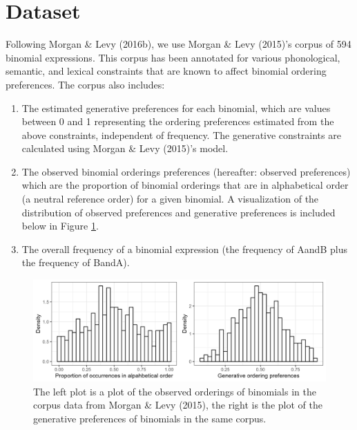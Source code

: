 \documentclass[10pt, letterpaper]{article}
\newenvironment{CodeChunk}{}{}
\begin{document}
\hypertarget{dataset}{%
\section{Dataset}\label{dataset}}

Following Morgan \& Levy (2016b), we use Morgan \& Levy (2015)'s corpus
of 594 binomial expressions. This corpus has been annotated for various
phonological, semantic, and lexical constraints that are known to affect
binomial ordering preferences. The corpus also includes:

\begin{enumerate}
\def\labelenumi{\arabic{enumi}.}
\item
  The estimated generative preferences for each binomial, which are
  values between 0 and 1 representing the ordering preferences estimated
  from the above constraints, independent of frequency. The generative
  constraints are calculated using Morgan \& Levy (2015)'s model.
\item
  The observed binomial orderings preferences (hereafter: observed
  preferences) which are the proportion of binomial orderings that are
  in alphabetical order (a neutral reference order) for a given
  binomial. A visualization of the distribution of observed preferences
  and generative preferences is included below in Figure
  \ref{fig:corpusplot1}.
\item
  The overall frequency of a binomial expression (the frequency of AandB
  plus the frequency of BandA).
\end{enumerate}

\begin{CodeChunk}
\begin{figure}[tb]

{\centering \includegraphics[width=1\linewidth]{Figures/corpus_plots} 

}

\caption[The left plot is a plot of the observed orderings of binomials in the corpus data from Morgan \& Levy (2015), the right is the plot of the generative preferences of binomials in the same corpus]{The left plot is a plot of the observed orderings of binomials in the corpus data from Morgan \& Levy (2015), the right is the plot of the generative preferences of binomials in the same corpus.}\label{fig:corpusplot1}
\end{figure}
\end{CodeChunk}
\end{document}
